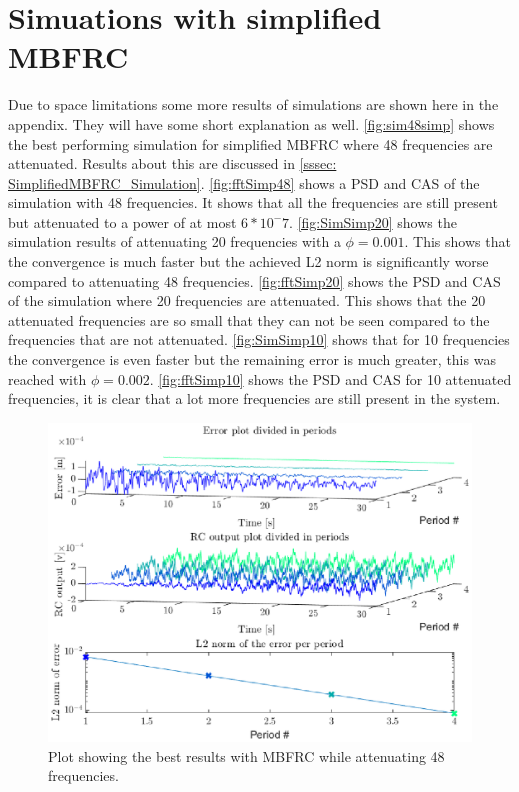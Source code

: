 \documentclass[journal]{IEEEtran}
\begin{document}
\section{Simuations with simplified MBFRC}\label{app:SimSim}
Due to space limitations some more results of simulations are shown here in the appendix. They will have some short explanation as well. \autoref{fig:sim48simp} shows the best performing simulation for simplified MBFRC where 48 frequencies are attenuated. Results about this are discussed in \autoref{sssec: SimplifiedMBFRC_Simulation}. \autoref{fig:fftSimp48} shows a PSD and CAS of the simulation with 48 frequencies. It shows that all the frequencies are still present but attenuated to a power of at most \(6*10^-7\). \autoref{fig:SimSimp20} shows the simulation results of attenuating 20 frequencies with a $\phi = 0.001$. This shows that the convergence is much faster but the achieved L2 norm is significantly worse compared to attenuating 48 frequencies. \autoref{fig:fftSimp20} shows the PSD and CAS of the simulation where 20 frequencies are attenuated. This shows that the 20 attenuated frequencies are so small that they can not be seen compared to the frequencies that are not attenuated. \autoref{fig:SimSimp10} shows that for 10 frequencies the convergence is even faster but the remaining error is much greater, this was reached with $\phi =0.002$. \autoref{fig:fftSimp10} shows the PSD and CAS for 10 attenuated frequencies, it is clear that a lot more frequencies are still present in the system.
\begin{figure}
    \centering
    \includegraphics[width=1\linewidth]{figures/simple_MBFRC/SimulationSimp48.eps}
    \caption{Plot showing the best results with MBFRC while attenuating 48 frequencies.}
    \label{fig:sim48simp}
\end{figure}
\end{document}
